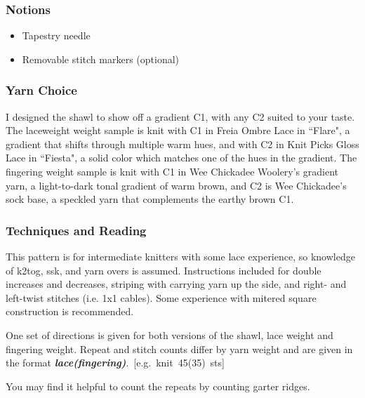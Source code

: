 \documentclass[12pt]{article}
\newcommand{\vocab}[1]{\emph{\textbf{#1}}} %
\begin{document}
\begin{titlingpage}
\begin{multicols}{2}
\vspace{-1em}
\subsubsection*{Notions}
\begin{itemize}
\item Tapestry needle \vspace{-1em}
\item Removable stitch markers (optional)
\end{itemize}

\vspace{-2em}
\subsubsection*{Yarn Choice}

I designed the shawl to show off a gradient C1, with any C2 suited to your taste. The laceweight weight sample is knit with C1 in Freia Ombre Lace in ``Flare", a gradient that shifts through multiple warm hues, and with C2 in Knit Picks Gloss Lace in ``Fiesta", a solid color which matches one of the hues in the gradient. The fingering weight sample is knit with C1 in Wee Chickadee Woolery's gradient yarn, a light-to-dark tonal gradient of warm brown, and C2 is Wee Chickadee's sock base, a speckled yarn that complements the earthy brown C1.

\vspace{-1em}
\subsubsection*{Techniques and Reading}

This pattern is for intermediate knitters with some lace experience, so knowledge of k2tog, ssk, and yarn overs is assumed. Instructions included for double increases and decreases, striping with carrying yarn up the side, and right- and left-twist stitches (i.e. 1x1 cables). Some experience with mitered square construction is recommended.

\vspace{1em}
One set of directions is given for both versions of the shawl, lace weight and fingering weight. Repeat and stitch counts differ by yarn weight and are given in the format \mbox{\vocab{lace(fingering)}. [e.g. knit 45(35) sts]} 

You may find it helpful to count the repeats by counting garter ridges.

\end{multicols}


\end{titlingpage}
\end{document}
